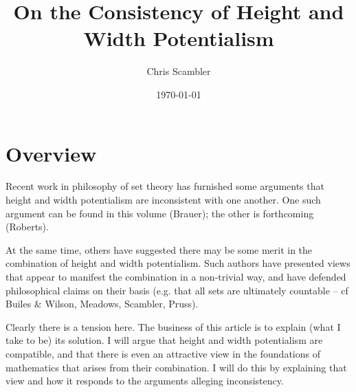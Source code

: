 \documentclass{article}
\title{On the Consistency of Height and Width Potentialism}
\author{Chris Scambler}
\date{\today}
\begin{document}
\maketitle
{}
\section{Overview}
Recent work in philosophy of set theory has furnished 
some arguments that height  and width  potentialism 
are inconsistent with one another. 
One such argument can be found in this volume (Brauer); 
the other is forthcoming (Roberts).

At the same time, others have suggested 
there may be some merit in the combination of 
height  and width  potentialism. Such authors 
have presented views that appear to manifest 
the combination in a non-trivial way, and have 
defended philosophical claims on their basis 
(e.g. that all sets are ultimately countable 
-- cf Builes \& Wilson, Meadows, 
Scambler, Pruss).  

Clearly there is a tension here. 
The business of this article is to explain 
(what I take to be) its solution. 
I will argue that height  and width  potentialism 
are compatible, and that there is  
even an attractive view in the foundations of 
mathematics that arises from their combination. 
I will do this by explaining that view and how it 
responds to the arguments alleging inconsistency.
\end{document}
